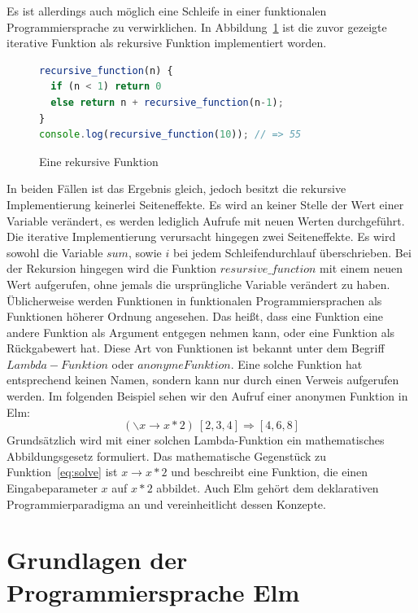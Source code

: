 Es ist allerdings auch möglich eine Schleife in einer funktionalen Programmiersprache zu verwirklichen. In Abbildung~\ref{fig:recursive-function} ist die zuvor gezeigte iterative Funktion als rekursive Funktion implementiert worden.
\begin{figure}[hb]
\begin{lstlisting}[language=JavaScript]
recursive_function(n) {
  if (n < 1) return 0
  else return n + recursive_function(n-1);
}
console.log(recursive_function(10)); // => 55
\end{lstlisting}
\caption{Eine rekursive Funktion}\label{fig:recursive-function}
\end{figure}

In beiden Fällen ist das Ergebnis gleich, jedoch besitzt die rekursive Implementierung keinerlei Seiteneffekte. Es wird an keiner Stelle der Wert einer Variable verändert, es werden lediglich Aufrufe mit neuen Werten durchgeführt. Die iterative Implementierung verursacht hingegen zwei Seiteneffekte. Es wird sowohl die Variable $sum$, sowie $i$ bei jedem Schleifendurchlauf überschrieben. Bei der Rekursion hingegen wird  die Funktion $resursive\_function$
mit einem neuen Wert aufgerufen, ohne jemals die ursprüngliche Variable verändert zu haben.
Üblicherweise werden Funktionen in funktionalen Programmiersprachen als Funktionen höherer Ordnung angesehen. Das heißt, dass eine Funktion eine andere Funktion als Argument entgegen nehmen kann, oder eine Funktion als Rückgabewert hat. Diese Art von Funktionen ist bekannt unter dem Begriff $Lambda-Funktion$ oder $anonyme Funktion$. Eine solche Funktion hat entsprechend keinen Namen, sondern kann nur durch einen Verweis aufgerufen werden. Im folgenden Beispiel sehen wir den Aufruf einer anonymen Funktion in Elm:
\begin{equation} \label{eq:solve}
(\backslash x \rightarrow x * 2)\ [ 2, 3, 4 ] \Longrightarrow [4, 6, 8]
\end{equation}
Grundsätzlich wird mit einer solchen Lambda-Funktion ein mathematisches Abbildungsgesetz formuliert. Das mathematische Gegenstück zu Funktion~\ref{eq:solve} ist $x \rightarrow x * 2$ und beschreibt eine Funktion, die einen Eingabeparameter $x$ auf $x*2$ abbildet. Auch Elm gehört dem deklarativen Programmierparadigma an und vereinheitlicht dessen Konzepte.

\section{Grundlagen der Programmiersprache Elm}
\label{sec:Was ist Elm?}

